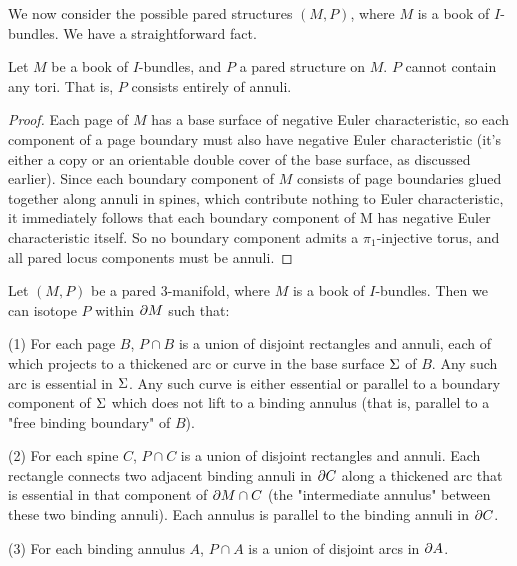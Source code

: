 We now consider the possible pared structures $(M,P)$, where $M$ is a book of
$I$-bundles. We have a straightforward fact.

\begin{prop}\label{P:annuli}

Let $M$ be a book of $I$-bundles, and $P$ a pared structure on $M$. $P$ cannot
contain any tori.  That is, $P$ consists entirely of annuli.

\end{prop}

\begin{proof}

Each page of $M$ has a base surface of negative Euler characteristic, so each
component of a page boundary must also have negative Euler characteristic (it's
either a copy or an orientable double cover of the base surface, as discussed
earlier). Since each boundary component of $M$ consists of page boundaries
glued together along annuli in spines, which contribute nothing to Euler
characteristic, it immediately follows that each boundary component of M has
negative Euler characteristic itself. So no boundary component admits
a $\pi_1$-injective torus, and all pared locus components must be annuli.

\end{proof}

\begin{lemma}

Let $(M,P)$ be a pared 3-manifold, where $M$ is a book of $I$-bundles. Then we
can isotope $P$ within $\partial M$ such that:

(1) For each page $B$, $P \cap B$ is a union of disjoint rectangles and annuli,
each of which projects to a thickened arc or curve in the base surface $\Sigma$ of
$B$.  Any such arc is essential in $\Sigma$. Any such curve is either essential or
parallel to a boundary component of $\Sigma$ which does not lift to a binding
annulus (that is, parallel to a "free binding boundary" of $B$).

(2) For each spine $C$, $P \cap C$ is a union of disjoint rectangles and
annuli.  Each rectangle connects two adjacent binding annuli in $\partial C$ along
a thickened arc that is essential in that component of $\partial M \cap C$ (the
"intermediate annulus" between these two binding annuli). Each annulus is
parallel to the binding annuli in $\partial C$.

(3) For each binding annulus $A$, $P \cap A$ is a union of disjoint arcs in
$\partial A$.

\end{lemma}

